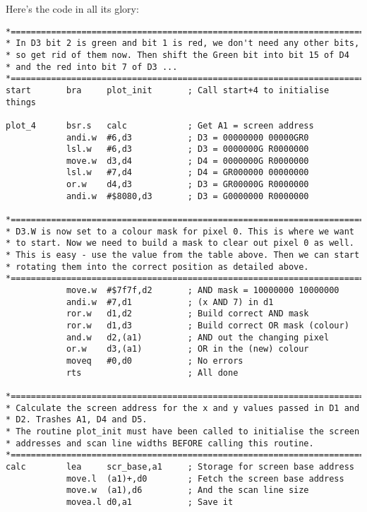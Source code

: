 Here's the code in all its glory:

\begin{lstlisting}[firstnumber=1,caption={Mode 4 Screen Plotting},label={lst:Mode4ScreenPlotting}]
*======================================================================
* In D3 bit 2 is green and bit 1 is red, we don't need any other bits, 
* so get rid of them now. Then shift the Green bit into bit 15 of D4 
* and the red into bit 7 of D3 ...
*======================================================================
start       bra     plot_init       ; Call start+4 to initialise things

plot_4      bsr.s   calc            ; Get A1 = screen address
            andi.w  #6,d3           ; D3 = 00000000 00000GR0
            lsl.w   #6,d3           ; D3 = 0000000G R0000000
            move.w  d3,d4           ; D4 = 0000000G R0000000
            lsl.w   #7,d4           ; D4 = GR000000 00000000
            or.w    d4,d3           ; D3 = GR00000G R0000000
            andi.w  #$8080,d3       ; D3 = G0000000 R0000000

*======================================================================
* D3.W is now set to a colour mask for pixel 0. This is where we want 
* to start. Now we need to build a mask to clear out pixel 0 as well. 
* This is easy - use the value from the table above. Then we can start 
* rotating them into the correct position as detailed above.
*======================================================================
            move.w  #$7f7f,d2       ; AND mask = 10000000 10000000
            andi.w  #7,d1           ; (x AND 7) in d1
            ror.w   d1,d2           ; Build correct AND mask
            ror.w   d1,d3           ; Build correct OR mask (colour)
            and.w   d2,(a1)         ; AND out the changing pixel
            or.w    d3,(a1)         ; OR in the (new) colour
            moveq   #0,d0           ; No errors
            rts                     ; All done

*======================================================================
* Calculate the screen address for the x and y values passed in D1 and
* D2. Trashes A1, D4 and D5.
* The routine plot_init must have been called to initialise the screen 
* addresses and scan line widths BEFORE calling this routine.
*======================================================================
calc        lea     scr_base,a1     ; Storage for screen base address
            move.l  (a1)+,d0        ; Fetch the screen base address
            move.w  (a1),d6         ; And the scan line size
            movea.l d0,a1           ; Save it


\end{lstlisting}
